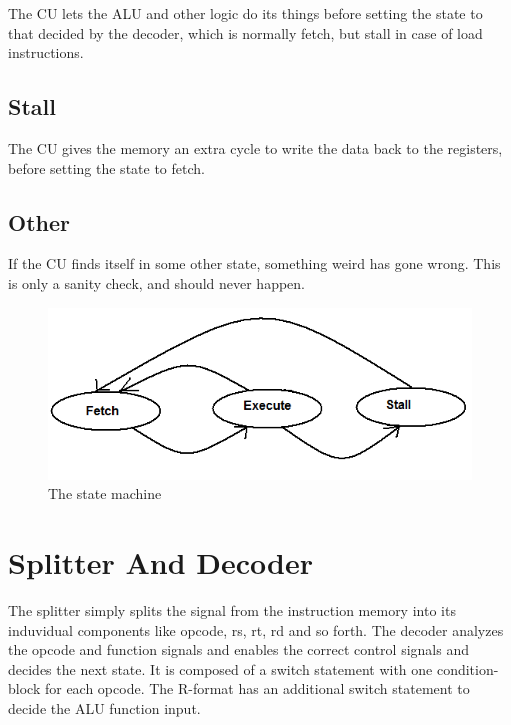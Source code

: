 The CU lets the ALU and other logic do its things before setting the state to that
decided by the decoder, which is normally fetch, but stall in case of load instructions.

\subsection{Stall}

The CU gives the memory an extra cycle to write the data back to the registers, before setting the state to fetch.

\subsection{Other}

If the CU finds itself in some other state, something weird has gone wrong.
This is only a sanity check, and should never happen.

\begin{figure}[ht]
    \centering
    \includegraphics[scale=0.5]{figures/controlunitstatemachine.png}
    \caption{\label{fig:stateMachine}The state machine}
\end{figure}

\section{Splitter And Decoder}

The splitter simply splits the signal from the instruction memory into
its induvidual components like opcode, rs, rt, rd and so forth.
The decoder analyzes the opcode and function signals
and enables the correct control signals and decides the next state.
It is composed of a switch statement with one condition-block for each opcode.
The R-format has an additional switch statement to decide the ALU function input.

